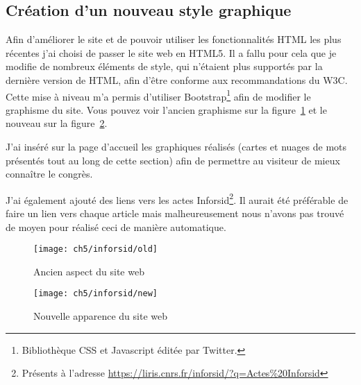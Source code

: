 			
		\subsection{Création d\rq{}un nouveau style graphique}
			Afin d\rq{}améliorer le site et de pouvoir utiliser les fonctionnalités HTML les plus récentes j\rq{}ai choisi de passer le site web en HTML5. Il a fallu pour cela que je modifie de nombreux éléments de style, qui n\rq{}étaient plus supportés par la dernière version de HTML, afin d'être conforme aux recommandations du W3C. Cette mise à niveau m\rq{}a permis d\rq{}utiliser Bootstrap\footnote{Bibliothèque CSS et Javascript éditée par Twitter.} afin de modifier le graphisme du site. Vous pouvez voir l\rq{}ancien graphisme sur la figure~\ref{fig:old} et le nouveau sur la figure~\ref{fig:new}.
			
			J\rq{}ai inséré sur la page d\rq{}accueil les graphiques réalisés (cartes et nuages de mots présentés tout au long de cette section) afin de permettre au visiteur de mieux connaître le congrès.
		
			J'ai également ajouté des liens vers les actes Inforsid\footnote{Présents à l'adresse \url{https://liris.cnrs.fr/inforsid/?q=Actes\%20Inforsid}}. Il aurait été préférable de faire un lien vers chaque article mais malheureusement nous n'avons pas trouvé de moyen pour réalisé ceci de manière automatique.
			
			\begin{figure}[p]
				\centering
				\texttt{[image: ch5/inforsid/old]}
				\caption{Ancien aspect du site web}\label{fig:old}
			\end{figure}
			
			\begin{figure}[p]
				\centering
				\texttt{[image: ch5/inforsid/new]}
				\caption{Nouvelle apparence du site web}\label{fig:new}
			\end{figure}

